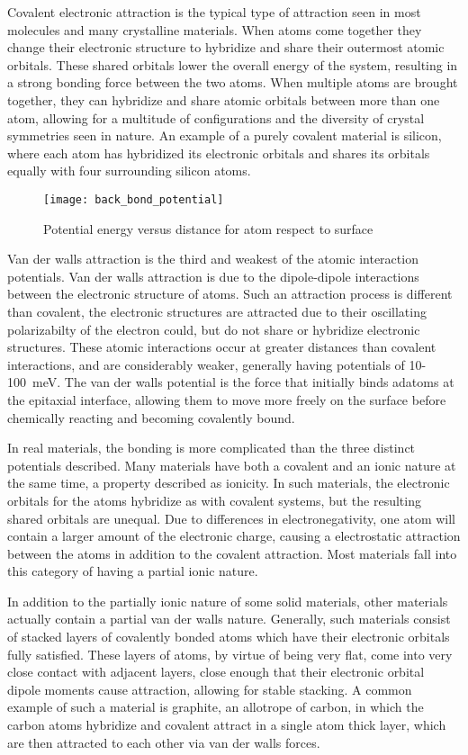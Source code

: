 Covalent electronic attraction is the typical type of attraction seen in most molecules and many crystalline materials. When atoms come together they change their electronic structure to hybridize and share their outermost atomic orbitals. These shared orbitals lower the overall energy of the system, resulting in a strong bonding force between the two atoms. When multiple atoms are brought together, they can hybridize and share atomic orbitals between more than one atom, allowing for a multitude of configurations and the diversity of crystal symmetries seen in nature. An example of a purely covalent material is silicon, where each atom has hybridized its electronic orbitals and shares its orbitals equally with four surrounding silicon atoms.
\begin{figure}
    \centering
    \texttt{[image: back\_bond\_potential]}
    \caption[Energy potentials between two atoms]{\label{fig:back_bond_potential}Potential energy versus distance for atom respect to surface}
\end{figure}
Van der walls attraction is the third and weakest of the atomic interaction potentials. Van der walls attraction is due to the dipole-dipole interactions between the electronic structure of atoms. Such an attraction process is different than covalent, the electronic structures are attracted due to their oscillating polarizabilty of the electron could, but do not share or hybridize electronic structures. These atomic interactions occur at greater distances than covalent interactions, and are considerably weaker, generally having potentials of 10-100~meV. The van der walls potential is the force that initially binds adatoms at the epitaxial interface, allowing them to move more freely on the surface before chemically reacting and becoming covalently bound.

In real materials, the bonding is more complicated than the three distinct potentials described. Many materials have both a covalent and an ionic nature at the same time, a property described as ionicity. In such materials, the electronic orbitals for the atoms hybridize as with covalent systems, but the resulting shared orbitals are unequal. Due to differences in electronegativity, one atom will contain a larger amount of the electronic charge, causing a electrostatic attraction between the atoms in addition to the covalent attraction. Most materials fall into this category of having a partial ionic nature.

In addition to the partially ionic nature of some solid materials, other materials actually contain a partial van der walls nature. Generally, such materials consist of stacked layers of covalently bonded atoms which have their electronic orbitals fully satisfied. These layers of atoms, by virtue of being very flat, come into very close contact with adjacent layers, close enough that their electronic orbital dipole moments cause attraction, allowing for stable stacking. A common example of such a material is graphite, an allotrope of carbon, in which the carbon atoms hybridize and covalent attract in a single atom thick layer, which are then attracted to each other via van der walls forces.



